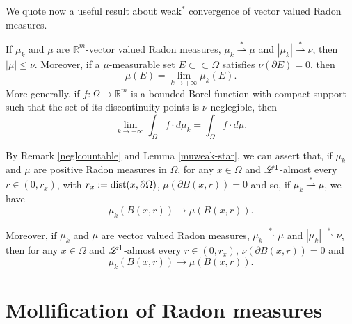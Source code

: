 We quote now a useful result about weak$^{*}$ convergence of vector valued Radon measures.

\begin{lemma} \label{muweak-star} 
If $\mu_{k}$ and $\mu$ are $\mathbb{R}^{m}$-vector valued Radon measures, $\mu_{k} \stackrel {*}{\rightharpoonup} \mu$ and $|\mu_{k}| \stackrel {*} {\rightharpoonup} \nu$, then $|\mu| \le \nu$. Moreover, if a $\mu$-measurable set $E \subset \subset \Omega$ satisfies $\nu(\partial E) = 0$, then 
\[ \mu(E) = \lim_{k \to +\infty} \mu_{k}(E).  \]
More generally, if $f : \Omega \to \mathbb{R}^{m}$ is a bounded Borel function with compact support such that the set of its discontinuity points is $\nu$-neglegible, then
\[ \lim_{k \to +\infty} \int_{\Omega} f \cdot d\mu_{k} = \int_{\Omega} f \cdot d\mu.  \]
\end{lemma}

\begin{remark} By Remark \ref{neglcountable} and Lemma \ref{muweak-star}, we can assert that, if $\mu_{k}$ and $\mu$ are positive Radon measures in $\Omega$, for any $x \in \Omega$ and $\mathscr{L}^{1}$-almost every $r \in (0, r_{x})$, with $r_{x} := {\rm dist}(x, \partial \Omega)$, $\mu(\partial B(x,r)) = 0$ and so, if $\mu_{k} \stackrel {*} {\rightharpoonup} \mu$, we have $$\mu_{k}(B(x,r)) \to \mu(B(x,r)).$$

Moreover, if $\mu_{k}$ and $\mu$ are vector valued Radon measures, $\mu_{k} \stackrel {*}{\rightharpoonup} \mu$ and $|\mu_{k}| \stackrel {*} {\rightharpoonup} \nu$, then for any $x \in \Omega$ and $\mathscr{L}^{1}$-almost every $r \in (0, r_{x})$, $\nu(\partial B(x,r)) = 0$ and $$\mu_{k}(B(x,r)) \to \mu(B(x,r)).$$
\end{remark}


\section{Mollification of Radon measures}

